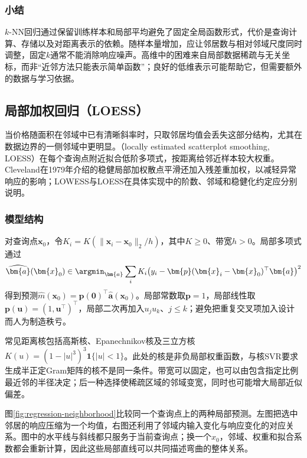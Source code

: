 \subsubsection{小结}

$k$-NN回归通过保留训练样本和局部平均避免了固定全局函数形式，代价是查询计算、存储以及对距离表示的依赖。随样本量增加，应让邻居数与相对邻域尺度同时调整，固定$k$通常不能消除响应噪声。高维中的困难来自局部数据稀疏与无关坐标，而非“近邻方法只能表示简单函数”；良好的低维表示可能帮助它，但需要额外的数据与学习依据。

\subsection{局部加权回归（LOESS）}
\label{sec:regression-loess}

当价格随面积在邻域中已有清晰斜率时，只取邻居均值会丢失这部分结构，尤其在数据边界的一侧邻域中更明显。（locally estimated scatterplot smoothing, LOESS）在每个查询点附近拟合低阶多项式，按距离给邻近样本较大权重。Cleveland在1979年介绍的稳健局部加权散点平滑还加入残差重加权，以减轻异常响应的影响；LOWESS与LOESS在具体实现中的阶数、邻域和稳健化约定应分别说明。

\subsubsection{模型结构}

对查询点$\bm{x}_0$，令$K_i=K(\lVert\bm{x}_i-\bm{x}_0\rVert_2/h)$，其中$K\geq0$、带宽$h>0$。局部多项式通过
\begin{equation}
  \widehat{\bm{a}}(\bm{x}_0)
  \in\argmin_{\bm{a}}\sum_iK_i
     \bigl(y_i-\bm{p}(\bm{x}_i-\bm{x}_0)^{\top}\bm{a}\bigr)^2
  \label{eq:regression-local-polynomial}
\end{equation}
得到预测$\widehat m(\bm{x}_0)=\bm{p}(\bm{0})^{\top}\widehat{\bm{a}}(\bm{x}_0)$。局部常数取$\bm{p}=1$，局部线性取$\bm{p}(\bm{u})=(1,\bm{u}^{\top})^{\top}$，局部二次再加入$u_ju_k$、$j\leq k$；避免把重复交叉项加入设计而人为制造秩亏。

常见距离核包括高斯核、Epanechnikov核及三立方核$K(u)=(1-|u|^3)^3\mathbf{1}\{|u|<1\}$。此处的核是非负局部权重函数，与核SVR要求生成半正定Gram矩阵的核不是同一条件。带宽可以固定，也可以由包含指定比例最近邻的半径决定；后一种选择使稀疏区域的邻域变宽，同时也可能增大局部近似偏差。

图\ref{fig:regression-neighborhood}比较同一个查询点上的两种局部预测。左图把选中邻居的响应压缩为一个均值，右图还利用了邻域内输入变化与响应变化的对应关系。图中的水平线与斜线都只服务于当前查询点；换一个$x_0$，邻域、权重和拟合系数都会重新计算，因此这些局部直线可以共同描述弯曲的整体关系。


